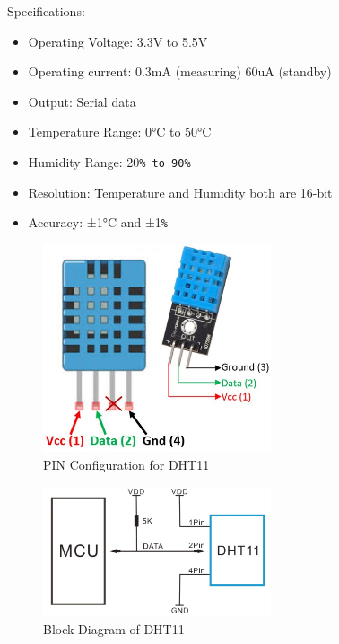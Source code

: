 \documentclass[12pt]{article}
\begin{document}
\hspace{1cm}Specifications: 
\begin{itemize}[leftmargin=2cm]
    \item Operating Voltage: 3.3V to 5.5V
    \item Operating current: 0.3mA (measuring) 60uA (standby)
    \item Output: Serial data
    \item Temperature Range: 0°C to 50°C
    \item Humidity Range: 20\verb|% to 90%|
    \item Resolution: Temperature and Humidity both are 16-bit
    \item Accuracy: ±1°C and ±1\verb|%|
\end{itemize}

\newpage

\begin{figure}[ht]
    \centering
    \includegraphics[width=0.6\textwidth]{images/image13.png}
    \caption{PIN Configuration for DHT11}
    \label{fig:pic8}
\end{figure} 

\begin{figure}[ht]
    \centering
    \includegraphics[width=0.6\textwidth]{images/image14.png}
    \caption{Block Diagram of DHT11}
    \label{fig:pic9}
\end{figure} 
\end{document}
